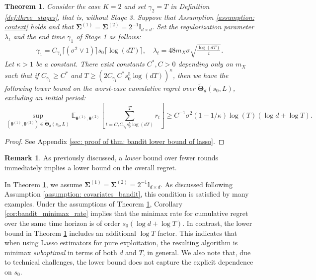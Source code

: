 \documentclass[aos,preprint]{imsart}
\theoremstyle{plain}
\newtheorem{theorem}{Theorem}
\theoremstyle{definition}
\newtheorem{remark}{Remark}
\newcommand{\bTheta}{\boldsymbol{\Theta}}
\newcommand{\btheta}{\boldsymbol{\theta}}
\newcommand{\bSigma}{\boldsymbol{\Sigma}}
\newcommand{\Exp}{\mathbb{E}}
\begin{document}
\begin{theorem}\label{thm: bandit lower bound of lasso} Consider the case $K =2$ and set $\gamma_2 = T$ in Definition \ref{def:three_stages}, that is, without Stage 3. 
Suppose that Assumption  \ref{assumption: context} holds and that $\bSigma^{(1)} = \bSigma^{(2)} = 2^{-1} \mathbb{I}_{d \times d}$.  Set the regularization parameter $\lambda_t$ and the end time $\gamma_1$ of Stage 1 as follows:
\begin{align*}
\gamma_1 = C_{\gamma_1} \lceil(\sigma^2\vee 1)\rceil s_0 \lceil \log (dT) \rceil, \quad
\lambda_t = 48 m_X\sigma\sqrt{\frac{\log (dT)}{t}}.
\end{align*}
Let $\kappa >1$ be a constant. There exist  constants $C^*, C > 0$ depending only on $m_X$ such that if 
$
C_{\gamma_1} \geq C^*$ and $T  \geq (2C_{\gamma_1} C^*  s_0^5\log(dT) )^\kappa$,
then we have the following lower bound on the worst-case cumulative regret over $\widetilde{\bTheta}_{d}(s_0,L)$, excluding an initial period:
$$
\sup_{(\btheta^{(1)}, \btheta^{(2)}) \in \widetilde{\bTheta}_{d}(s_0,L)}  \Exp_{\btheta^{(1)}, \btheta^{(2)}}\left[\sum_{t=C_* C_{\gamma_1} s_0^5 \log(dT)}^T r_t \right] 
\ge C^{-1} \sigma^2 (1-1/\kappa)  \log(T)(\log d+\log T).$$
\end{theorem}
\begin{proof}
    See Appendix \ref{sec: proof of thm: bandit lower bound of lasso}. 
\end{proof}

\begin{remark}
As previously discussed, a \emph{lower} bound over fewer rounds immediately implies a lower bound on the overall regret.
\end{remark}

In Theorem \ref{thm: bandit lower bound of lasso}, we assume $\bSigma^{(1)} = \bSigma^{(2)} = 2^{-1}\mathbb{I}_{d \times d}$. As discussed following Assumption \ref{assumption: covariates_bandit}, this condition is satisfied by many examples. Under the assumptions of Theorem \ref{thm: bandit lower bound of lasso}, Corollary \ref{cor:bandit_minimax_rate} implies that the minimax rate for cumulative regret over the same time horizon is of order $s_0(\log d + \log T)$. In contrast, the lower bound in Theorem \ref{thm: bandit lower bound of lasso} includes an additional $\log T$ factor. This indicates that when using Lasso estimators for pure exploitation, the resulting algorithm is minimax \emph{suboptimal} in terms of both $d$ and $T$, in general. We also note that, due to technical challenges, the lower bound does not capture the explicit dependence on $s_0$.
\end{document}
